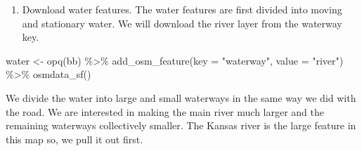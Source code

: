 \documentclass[
  paper=a4,
  ,captions=tableheading
]{scrartcl}
\newenvironment{Shaded}{\begin{snugshade}}{\end{snugshade}}
\newcommand{\AttributeTok}[1]{\textcolor[rgb]{0.77,0.63,0.00}{#1}}
\newcommand{\DecValTok}[1]{\textcolor[rgb]{0.00,0.00,0.81}{#1}}
\newcommand{\FunctionTok}[1]{\textcolor[rgb]{0.00,0.00,0.00}{#1}}
\newcommand{\NormalTok}[1]{#1}
\newcommand{\OtherTok}[1]{\textcolor[rgb]{0.56,0.35,0.01}{#1}}
\newcommand{\SpecialCharTok}[1]{\textcolor[rgb]{0.00,0.00,0.00}{#1}}
\newcommand{\StringTok}[1]{\textcolor[rgb]{0.31,0.60,0.02}{#1}}
\providecommand{\tightlist}{%
  \setlength{\itemsep}{0pt}\setlength{\parskip}{0pt}}
\begin{document}
\begin{enumerate}
\def\labelenumi{\arabic{enumi}.}
\setcounter{enumi}{2}
\tightlist
\item
  Download water features. The water features are first divided into
  moving and stationary water. We will download the river layer from the
  waterway key.
\end{enumerate}

\begin{Shaded}
\begin{Highlighting}[]
\NormalTok{water }\OtherTok{\textless{}{-}} 
  \FunctionTok{opq}\NormalTok{(bb) }\SpecialCharTok{\%\textgreater{}\%} 
  \FunctionTok{add\_osm\_feature}\NormalTok{(}\AttributeTok{key =} \StringTok{"waterway"}\NormalTok{, }\AttributeTok{value =} \StringTok{"river"}\NormalTok{) }\SpecialCharTok{\%\textgreater{}\%} 
  \FunctionTok{osmdata\_sf}\NormalTok{()}
\end{Highlighting}
\end{Shaded}

We divide the water into large and small waterways in the same way we
did with the road. We are interested in making the main river much
larger and the remaining waterways collectively smaller. The Kansas
river is the large feature in this map so, we pull it out first.

\begin{Shaded}
\end{Shaded}
\end{document}
